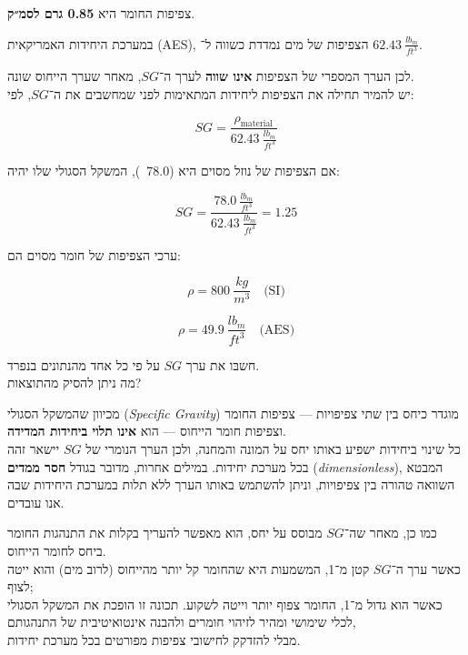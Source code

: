 \documentclass[
  hebrew,
  letterpaper,
  DIV=11,
  numbers=noendperiod]{scrreprt}
\begin{document}
צפיפות החומר היא \textbf{0.85 גרם לסמ״ק}.

במערכת היחידות האמריקאית (AES), הצפיפות של מים נמדדת כשווה ל־
\(62.43\ \frac{lb_{m}}{ft^{3}}\).

לכן הערך המספרי של הצפיפות \textbf{אינו שווה} לערך ה־\(SG\), מאחר שערך
הייחוס שונה.\\
יש להמיר תחילה את הצפיפות ליחידות המתאימות לפני שמחשבים את ה־\(SG\),
לפי:

\[
SG = \frac{\rho_{\text{material}}}{62.43\ \frac{lb_{m}}{ft^{3}}}
\]

אם הצפיפות של נוזל מסוים היא (78.0~), המשקל הסגולי
שלו יהיה:

\[
SG = \frac{78.0\ \frac{lb_{m}}{ft^{3}}}{62.43\ \frac{lb_{m}}{ft^{3}}} = 1.25
\]

ערכי הצפיפות של חומר מסוים הם:

\[
\rho = 800\ \frac{kg}{m^{3}} \quad \text{(SI)}
\]

\[
\rho = 49.9\ \frac{lb_{m}}{ft^{3}} \quad \text{(AES)}
\]

חשבּו את ערך \(SG\) על פי כל אחד מהנתונים בנפרד.\\
מה ניתן להסיק מהתוצאות?

מכיוון שהמשקל הסגולי (\emph{Specific Gravity}) מוגדר כיחס בין שתי
צפיפויות --- צפיפות החומר וצפיפות חומר הייחוס --- הוא \textbf{אינו תלוי
ביחידות המדידה}.\\
כל שינוי ביחידות ישפיע באותו יחס על המונה והמחנה, ולכן הערך הנומרי של
\(SG\) יישאר זהה בכל מערכת יחידות. במילים אחרות, מדובר בגודל \textbf{חסר
ממדים} (\emph{dimensionless}), המבטא השוואה טהורה בין צפיפויות, וניתן
להשתמש באותו הערך ללא תלות במערכת היחידות שבה אנו עובדים.

כמו כן, מאחר שה־\(SG\) מבוסס על יחס, הוא מאפשר להעריך בקלות את התנהגות
החומר ביחס לחומר הייחוס.\\
כאשר ערך ה־\(SG\) קטן מ־1, המשמעות היא שהחומר קל יותר מהייחוס (לרוב מים)
והוא ייטה לצוף;\\
כאשר הוא גדול מ־1, החומר צפוף יותר וייטה לשקוע. תכונה זו הופכת את המשקל
הסגולי לכלי שימושי ומהיר לזיהוי חומרים ולהבנה אינטואיטיבית של
התנהגותם,\\
מבלי להזדקק לחישובי צפיפות מפורטים בכל מערכת יחידות.
\end{document}
